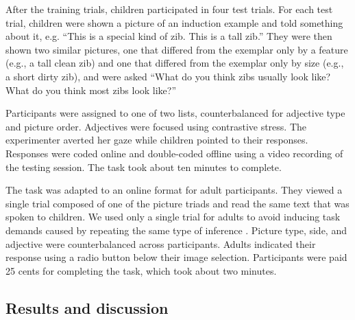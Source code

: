 \documentclass[man]{apa2}
\begin{document}
After the training trials, children participated in four test trials.  For each test trial, children were shown a picture of an induction example and told something about it, e.g. ``This is a special kind of zib.  This is a tall zib.''  They were then shown two similar pictures, one that differed from the exemplar only by a feature (e.g., a tall clean zib) and one that differed from the exemplar only by size (e.g., a short dirty zib), and were asked ``What do you think zibs usually look like?  What do you think most zibs look like?'' 

Participants were assigned to one of two lists, counterbalanced for adjective type and picture order.  Adjectives were focused using contrastive stress. The experimenter averted her gaze while children pointed to their responses.  Responses were coded online and double-coded offline using a video recording of the testing session.  The task took about ten minutes to complete. 

The task was adapted to an online format for adult participants. They viewed a single trial composed of one of the picture triads and read the same text that was spoken to children. We used only a single trial for adults to avoid inducing task demands caused by repeating the same type of inference \cite{frank2012}. Picture type, side, and adjective were counterbalanced across participants.  Adults indicated their response using a radio button below their image selection.  Participants were paid 25 cents for completing the task, which took about two minutes. 

\subsection{Results and discussion}
\end{document}
